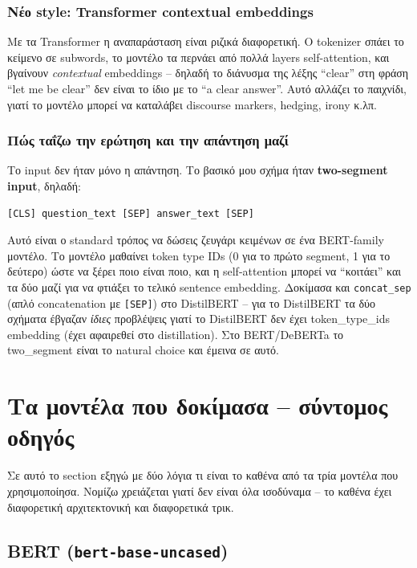 \documentclass[12pt]{fphw}
\begin{document}
\subsubsection{Νέο style: Transformer contextual embeddings}

Με τα Transformer η αναπαράσταση είναι ριζικά διαφορετική. Ο tokenizer σπάει το κείμενο σε subwords, το μοντέλο τα περνάει από πολλά layers self-attention, και βγαίνουν \emph{contextual} embeddings -- δηλαδή το διάνυσμα της λέξης ``clear'' στη φράση ``let me be clear'' δεν είναι το ίδιο με το ``a clear answer''. Αυτό αλλάζει το παιχνίδι, γιατί το μοντέλο μπορεί να καταλάβει discourse markers, hedging, irony κ.λπ.

\subsubsection{Πώς ταΐζω την ερώτηση και την απάντηση μαζί}

Το input δεν ήταν μόνο η απάντηση. Το βασικό μου σχήμα ήταν \textbf{two-segment input}, δηλαδή:
\begin{verbatim}
[CLS] question_text [SEP] answer_text [SEP]
\end{verbatim}
Αυτό είναι ο standard τρόπος να δώσεις ζευγάρι κειμένων σε ένα BERT-family μοντέλο. Το μοντέλο μαθαίνει token type IDs (0 για το πρώτο segment, 1 για το δεύτερο) ώστε να ξέρει ποιο είναι ποιο, και η self-attention μπορεί να ``κοιτάει'' και τα δύο μαζί για να φτιάξει το τελικό sentence embedding. Δοκίμασα και \texttt{concat\_sep} (απλό concatenation με \texttt{[SEP]}) στο DistilBERT -- για το DistilBERT τα δύο σχήματα έβγαζαν \emph{ίδιες} προβλέψεις γιατί το DistilBERT δεν έχει token\_type\_ids embedding (έχει αφαιρεθεί στο distillation). Στο BERT/DeBERTa το two\_segment είναι το natural choice και έμεινα σε αυτό.

\section{Τα μοντέλα που δοκίμασα -- σύντομος οδηγός}

Σε αυτό το section εξηγώ με δύο λόγια τι είναι το καθένα από τα τρία μοντέλα που χρησιμοποίησα. Νομίζω χρειάζεται γιατί δεν είναι όλα ισοδύναμα -- το καθένα έχει διαφορετική αρχιτεκτονική και διαφορετικά τρικ.

\subsection{BERT (\texttt{bert-base-uncased})}
\end{document}
